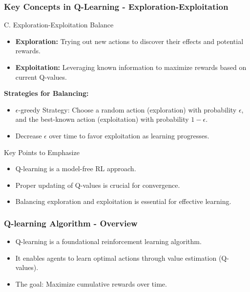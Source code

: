 \documentclass[aspectratio=169]{beamer}
\begin{document}
\begin{frame}[fragile]
    \frametitle{Key Concepts in Q-Learning - Exploration-Exploitation}
    \begin{block}{C. Exploration-Exploitation Balance}
        \begin{itemize}
            \item \textbf{Exploration:} Trying out new actions to discover their effects and potential rewards.
            \item \textbf{Exploitation:} Leveraging known information to maximize rewards based on current Q-values.
        \end{itemize}
        
        \textbf{Strategies for Balancing:}
        \begin{itemize}
            \item \(\epsilon\)-greedy Strategy: Choose a random action (exploration) with probability \( \epsilon \), and the best-known action (exploitation) with probability \( 1 - \epsilon \).
            \item Decrease \( \epsilon \) over time to favor exploitation as learning progresses.
        \end{itemize}
    \end{block}

    \begin{block}{Key Points to Emphasize}
        \begin{itemize}
            \item Q-learning is a model-free RL approach.
            \item Proper updating of Q-values is crucial for convergence.
            \item Balancing exploration and exploitation is essential for effective learning.
        \end{itemize}
    \end{block}
\end{frame}

\begin{frame}[fragile]
    \frametitle{Q-learning Algorithm - Overview}
    \begin{itemize}
        \item Q-learning is a foundational reinforcement learning algorithm.
        \item It enables agents to learn optimal actions through value estimation (Q-values).
        \item The goal: Maximize cumulative rewards over time.
    \end{itemize}
\end{frame}
\end{document}
